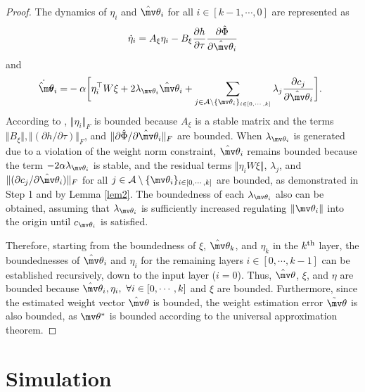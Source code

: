 \documentclass[lettersize,journal]{IEEEtran}
\newcommand*{\wth}{\mv\theta}
\begin{document}
\begin{proof}
The dynamics of $\eta_i$ and $\hat\wth_i$ for all $i\in [k-1,\cdots,0]$ are represented as
\begin{equation}
    \dot\eta_i = 
    A_\xi\eta_i -B_\xi {\partial h\over\partial\tau}
    {\partial \hat\Phi\over \partial \hat\wth_i}
\end{equation}
and
\begin{equation}
    \begin{aligned}
        \dot{\hat\wth}_i 
        =&
        -\alpha 
        \bigg[
            \eta_i^\top W\xi+2\lambda_{\wth_i} \hat\wth_i
            +
            \sum_{j\in\mathcal{A}\setminus \{\wth_i\}_{i\in[0,\cdots,k]}}\lambda_j{\partial c_j\over\partial \hat\wth_i}
        \bigg].
    \end{aligned}
\end{equation}
According to \cite[Chap.~4 T.~1.9]{RN13}, $\Vert\eta_i\Vert_F$ is bounded because $A_\xi$ is a stable matrix and the terms $\Vert B_\xi\Vert, \Vert(\partial h/\partial \tau)\Vert_F$, and $\Vert\partial \hat\Phi/\partial\hat\wth_i\Vert_F$ are bounded.
When $\lambda_{\wth_i}$ is generated due to a violation of the weight norm constraint, $\hat\wth_i$ remains bounded because the term $-2\alpha\lambda_{\wth_i}$ is stable, and the residual terms $\Vert\eta_iW\xi\Vert$, $\lambda_j$, and $\Vert(\partial c_j/\partial \hat\wth_i)\Vert_F$ for all $j\in\mathcal{A}\setminus \{\wth_i\}_{i\in[0,\cdots,k]}$ are bounded, as demonstrated in Step 1 and by Lemma \ref{lem2}.
The boundedness of each $\lambda_{\wth_i}$ also can be obtained, assuming that $\lambda_{\wth_i}$ is sufficiently increased regulating $\Vert\wth_i\Vert$ into the origin until $c_{\wth_i}$ is satisfied.

Therefore, starting from the boundedness of $\xi$, $\hat\wth_k$, and $\eta_k$ in the $k\textsuperscript{th}$ layer, the boundednesses of $\hat\wth_i$ and $\eta_i$ for the remaining layers $i\in[0,\cdots,k-1]$ can be established recursively, down to the input layer ($i=0$). Thus, $\hat\wth$, $\xi$, and $\eta$ are bounded because $\hat\wth_i,\eta_i,\ \forall i\in[0,\cdots,k]$ and $\xi$ are bounded. Furthermore, since the estimated weight vector $\hat\wth$ is bounded, the weight estimation error $\tilde\wth$ is also bounded, as $\wth^*$ is bounded according to the universal approximation theorem.

\end{proof}

\section{Simulation}\label{sec:sim}
\end{document}
